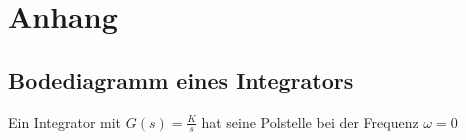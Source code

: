 \section{Anhang}

\subsection{Bodediagramm eines Integrators}

Ein Integrator mit $G(s) = \frac{K}{s}$ hat seine Polstelle bei der Frequenz $\omega = 0$

%  